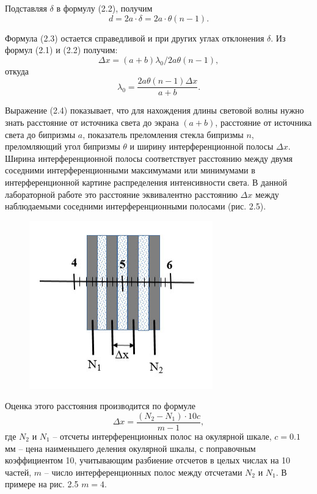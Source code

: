 Подставляя $\delta$ в формулу (2.2), получим
\begin{equation}
    d = 2a \cdot \delta = 2a \cdot \theta(n-1).
\end{equation}

Формула (2.3) остается справедливой и при других углах отклонения $\delta$. Из формул (2.1) и (2.2) получим:
$$ \Delta x = (a+b)\lambda_{0} / 2a\theta(n-1), $$
откуда
\begin{equation}
    \lambda_{0} = \frac{2a\theta(n-1)\Delta x}{a+b}.
    \label{eq:2.4}
\end{equation}

Выражение (2.4) показывает, что для нахождения длины световой волны нужно знать расстояние от источника света до экрана $(a+b)$, расстояние от источника света до бипризмы $a$, показатель преломления стекла бипризмы $n$, преломляющий угол бипризмы $\theta$ и ширину интерференционной полосы $\Delta x$. Ширина интерференционной полосы соответствует расстоянию между двумя соседними интерференционными максимумами или минимумами в интерференционной картине распределения интенсивности света. В данной лабораторной работе это расстояние эквивалентно расстоянию $\Delta x$ между наблюдаемыми соседними интерференционными полосами (рис. 2.5).

\begin{figure}[H]
    \centering
    \includegraphics[width=0.5\linewidth]{figs/3.png}
\end{figure}

Оценка этого расстояния производится по формуле
\begin{equation}
    \Delta x = \frac{(N_{2}-N_{1}) \cdot 10c}{m-1},
    \label{eq:2.5}
\end{equation}
где $N_{2}$ и $N_{1}$ -- отсчеты интерференционных полос на окулярной шкале, $c = 0.1$ мм -- цена наименьшего деления окулярной шкалы, с поправочным коэффициентом 10, учитывающим разбиение отсчетов в целых числах на 10 частей, $m$ -- число интерференционных полос между отсчетами $N_{2}$ и $N_{1}$. В примере на рис. 2.5 $m = 4$.



